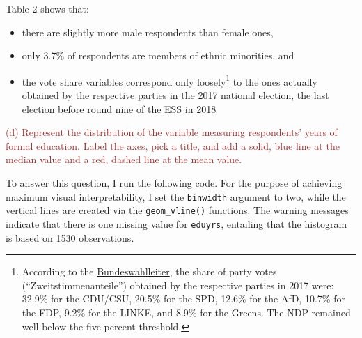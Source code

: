 \documentclass[
]{article}
\providecommand{\tightlist}{%
  \setlength{\itemsep}{0pt}\setlength{\parskip}{0pt}}
\begin{document}
Table 2 shows that:

\begin{itemize}
\tightlist
\item
  there are slightly more male respondents than female ones,
\item
  only 3.7\% of respondents are members of ethnic minorities, and
\item
  the vote share variables correspond only loosely\footnote{According to
    the
    \href{https://www.bundeswahlleiter.de/bundestagswahlen/2017/ergebnisse.html}{Bundeswahlleiter},
    the share of party votes (``Zweitstimmenanteile'') obtained by the
    respective parties in 2017 were: 32.9\% for the CDU/CSU, 20.5\% for
    the SPD, 12.6\% for the AfD, 10.7\% for the FDP, 9.2\% for the
    LINKE, and 8.9\% for the Greens. The NDP remained well below the
    five-percent threshold.} to the ones actually obtained by the
  respective parties in the 2017 national election, the last election
  before round nine of the ESS in 2018
\end{itemize}

\textcolor{brown}{(d) Represent the distribution of the variable measuring respondents’ years of formal education. Label the axes, pick a title, and add a solid, blue line at the median value and a red, dashed line at the mean value.}

To answer this question, I run the following code. For the purpose of
achieving maximum visual interpretability, I set the \texttt{binwidth}
argument to two, while the vertical lines are created via the
\texttt{geom\_vline()} functions. The warning messages indicate that
there is one missing value for \texttt{eduyrs}, entailing that the
histogram is based on 1530 observations.
\end{document}
